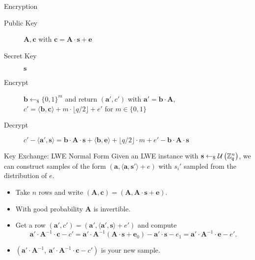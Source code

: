 \documentclass[presentation,smaller]{beamer}
\newcommand{\ZZ}[1][blank]{\ensuremath{\ifthenelse{\equal{#1}{blank}}{\mathbb{Z}}{\mathbb{Z}\left[#1\right]}\xspace}}
\renewcommand{\U}[1]{\ensuremath{\mathcal{U}\left( {#1} \right)}\xspace}
\renewcommand{\vec}[1]{\ensuremath{\mathbf{#1}}\xspace}
\newcommand{\sample}{\ensuremath{\leftarrow_{\$}}}
\begin{document}
\begin{frame}[label={sec:orgheadline15}]{Encryption}
\begin{description}
\item[{Public Key}] \(\vec{A},\vec{c}\) with \(\vec{c} = \vec{A}\cdot \vec{s} + \vec{e}\)
\item[{Secret Key}] \(\vec{s}\)
\item[{Encrypt}] \(\vec{b} \sample \{0,1\}^m\) and return \((\vec{a}',c')\) with \(\vec{a}' = \vec{b} \cdot \vec{A}\), \(c' = \langle \vec{b}, \vec{c} \rangle + m \cdot \lfloor q/2\rfloor + e'\) for \(m \in \{0,1\}\)

\item[{Decrypt}] \(c' - \langle \vec{a}', \vec{s} \rangle = \vec{b} \cdot \vec{A} \cdot \vec{s} + \langle \vec{b}, \vec{e} \rangle + \lfloor q/2 \rfloor \cdot m + e' -  \vec{b} \cdot \vec{A} \cdot \vec{s}\)
\end{description}
\end{frame}

\begin{frame}[label={sec:orgheadline16}]{Key Exchange: LWE Normal Form}
Given an LWE instance with \(\vec{s} \sample \U{\ZZ_q^n}\), we can construct samples of the form \((\vec{a}, \langle \vec{a}, \vec{s}'\rangle+e)\) with \(s_i'\) sampled from the distribution of \(e\).

\begin{itemize}
\item Take \(n\) rows and write \((\vec{A}, \vec{c}) = (\vec{A}, \vec{A}⋅\vec{s} + \vec{e})\).

\item With good probability \(\vec{A}\) is invertible.

\item Get a row \((\vec{a}', c') = (\vec{a}', \langle \vec{a}', \vec{s}\rangle + e')\) and compute  \[\vec{a}'⋅ \vec{A}^{-1} ⋅ \vec{c}-c' = \vec{a}' ⋅ \vec{A}^{-1} (\vec{A}⋅ \vec{s}+\vec{e}_0)- \vec{a}'·\vec{s}-e_1 = \vec{a}' ⋅ \vec{A}^{-1} ⋅ \vec{e} - e'.\]

\item \((\vec{a}' ⋅ \vec{A}^{-1},\  \vec{a}'⋅ \vec{A}^{-1} ⋅ \vec{c}-c')\) is your new sample.
\end{itemize}
\end{frame}
\end{document}
